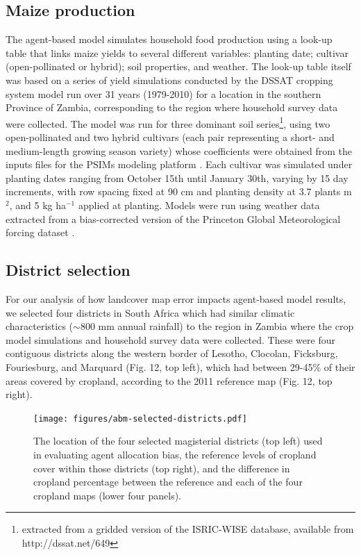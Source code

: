 \documentclass[11pt, titlepage]{article}
\begin{document}
\subsection{\large Maize production}
The agent-based model simulates household food production using a look-up table that links maize yields to several different variables: planting date; cultivar (open-pollinated or hybrid); soil properties, and weather.  The look-up table itself was based on a series of yield simulations conducted by the DSSAT cropping system model run over 31 years (1979-2010) for a location in the southern Province of Zambia, corresponding to the region where household survey data were collected. The model was run for three dominant soil series\footnote{extracted from a gridded version of the ISRIC-WISE database, available from http://dssat.net/649}, using two open-pollinated and two hybrid cultivars (each pair representing a short- and medium-length growing season variety) whose coefficients were obtained from the inputs files for the PSIMs modeling platform \citep{elliott_parallel_2014}. Each cultivar was simulated under planting dates ranging from October 15th until January 30th, varying by 15 day increments, with row spacing fixed at 90 cm and planting density at 3.7 plants m$^2$, and 5 kg ha$^{-1}$ applied at planting. Models were run using weather data extracted from a bias-corrected version of the Princeton Global Meteorological forcing dataset \citep{sheffield_development_2006,chaney_spatial_2014,estes_changing_2014}.  



\subsection{\large District selection}
For our analysis of how landcover map error impacts agent-based model results, we selected four districts in South Africa which had similar climatic characteristics ($\sim$800 mm annual rainfall) to the region in Zambia where the crop model simulations and household survey data were collected.  These were four contiguous districts along the western border of Lesotho, Clocolan, Ficksburg, Fouriesburg, and Marquard (Fig. 12, top left), which had between 29-45\% of their areas covered by cropland, according to the 2011 reference map (Fig. 12, top right).  

\begin{figure}[!ht]
  \centering
     \texttt{[image: figures/abm-selected-districts.pdf]} 
      \caption{The location of the four selected magisterial districts (top left) used in evaluating agent allocation bias, the reference levels of cropland cover within those districts (top right), and the difference in cropland percentage between the reference and each of the four cropland maps (lower four panels). }
      \label{fig:default}
\end{figure}
\end{document}
